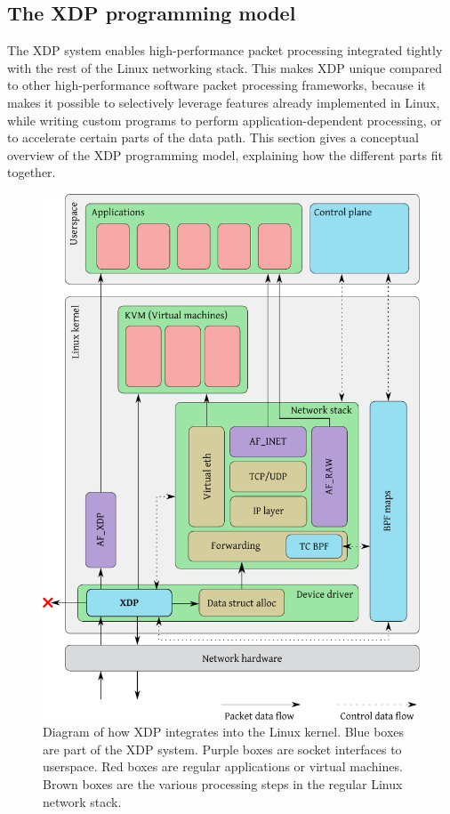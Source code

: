 \documentclass[10pt]{sig-alternate-05-2015}
\begin{document}
\subsection{The XDP programming model}
\label{sec:prog-model}
The XDP system enables high-performance packet processing integrated tightly
with the rest of the Linux networking stack. This makes XDP unique compared to
other high-performance software packet processing frameworks, because it makes
it possible to selectively leverage features already implemented in Linux, while
writing custom programs to perform application-dependent processing, or to
accelerate certain parts of the data path. This section gives a conceptual
overview of the XDP programming model, explaining how the different parts fit
together.

\begin{figure}[t]
\centering
\includegraphics[width=\linewidth]{figures/kernel-diagram.pdf}
\caption{\label{fig:xdp-kernel}
Diagram of how XDP integrates into the Linux kernel. Blue boxes are part of the XDP system. Purple boxes are socket interfaces to userspace. Red boxes are regular applications or virtual machines. Brown boxes are the various processing steps in the regular Linux network stack.}
\end{figure}
\end{document}
